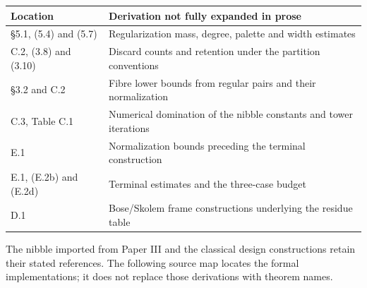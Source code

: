 \documentclass[english,11pt,a4paper]{article}
\newcounter{none}
\begin{document}

{\def\LTcaptype{none} %
\begin{longtable}[c]{@{}
  >{\raggedright\arraybackslash}p{}
  >{\raggedright\arraybackslash}p{}@{}}
\toprule\noalign{}
\begin{minipage}[b]{\linewidth}\raggedright
Location
\end{minipage} & \begin{minipage}[b]{\linewidth}\raggedright
Derivation not fully expanded in prose
\end{minipage} \\
\midrule\noalign{}
\endhead
\bottomrule\noalign{}
\endlastfoot
§5.1, (5.4) and (5.7) & Regularization mass, degree, palette and width estimates \\
C.2, (3.8) and (3.10) & Discard counts and retention under the partition conventions \\
§3.2 and C.2 & Fibre lower bounds from regular pairs and their normalization \\
C.3, Table C.1 & Numerical domination of the nibble constants and tower iterations \\
E.1 & Normalization bounds preceding the terminal construction \\
E.1, (E.2b) and (E.2d) & Terminal estimates and the three-case budget \\
D.1 & Bose/Skolem frame constructions underlying the residue table \\
\end{longtable}
}

The nibble imported from Paper III and the classical design constructions retain their stated references. The following source map locates the formal implementations; it does not replace those derivations with theorem names.
\end{document}
